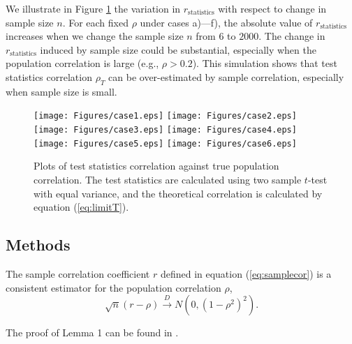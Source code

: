 We illustrate in Figure \ref{fig:tstat} the variation in $r_\text{statistics}$ with 
respect to change in sample size $n$. For each fixed $\rho$ under cases a)---f), the absolute 
value of $r_\text{statistics}$  increases when we change the sample size $n$ from $6$ to 
$2000$. The change in $r_\text{statistics}$ induced by sample size could be substantial, 
especially when the population correlation is large (e.g., $\rho > 0.2$). This simulation shows 
that test statistics correlation $\rho_T$ can be over-estimated by sample correlation, 
especially when sample size is small.

\begin{figure}[!th]
	\centering
	\texttt{[image: Figures/case1.eps]}
	\texttt{[image: Figures/case2.eps]}
	\texttt{[image: Figures/case3.eps]}
	\texttt{[image: Figures/case4.eps]}
	\texttt{[image: Figures/case5.eps]}
	\texttt{[image: Figures/case6.eps]}
	\caption[Plots of test statistics correlation against true population 
	correlation]{Plots of test statistics correlation against true population 
		correlation. The test statistics are calculated 
		using two sample $t$-test with equal variance, and the theoretical correlation is 
		calculated by 
		equation (\ref{eq:limitT}).}
	\label{fig:tstat}
\end{figure}






\subsection{Methods}\label{section:testcormethod}

\begin{lemma}
	The sample correlation coefficient $r$ defined in equation (\ref{eq:samplecor}) is a 
	consistent estimator for the population correlation $\rho$, 
	\[\sqrt{n}(r - \rho ) \stackrel{D}{\rightarrow}N\left(0, (1-\rho^2)^2\right).\]
\end{lemma}
The proof of Lemma 1 can be found in \citet{fisher1915frequency}. \\

